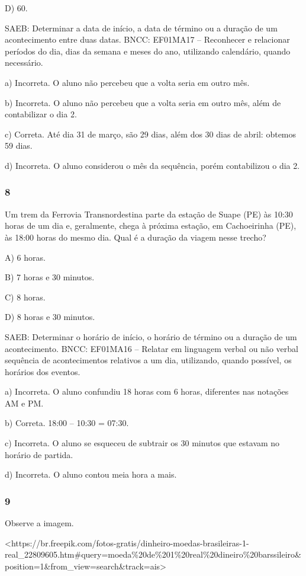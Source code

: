 D) 60.

SAEB: Determinar a data de início, a data de término ou a
duração de um acontecimento entre duas datas.
BNCC: EF01MA17 -- Reconhecer e relacionar períodos do dia, dias da semana
e meses do ano, utilizando calendário, quando necessário.

a) Incorreta. O aluno não percebeu que a volta seria em outro mês.

b) Incorreta. O aluno não percebeu que a volta seria em outro mês, além
de contabilizar o dia 2.

c) Correta. Até dia 31 de março, são 29 dias, além dos 30 dias de abril: obtemos
59 dias.

d) Incorreta. O aluno considerou o mês da sequência, porém contabilizou
o dia 2.

\subsubsection{8}\label{section-109}

Um trem da Ferrovia Transnordestina parte da estação de Suape (PE) às 10:30 horas de um dia e, geralmente, chega à próxima estação, em Cachoeirinha (PE), às 18:00 horas do mesmo dia. Qual é a duração da viagem nesse trecho?

A) 6 horas.

B) 7 horas e 30 minutos.

C) 8 horas.

D) 8 horas e 30 minutos.

SAEB: Determinar o horário de início, o horário de término ou a
duração de um acontecimento.
BNCC: EF01MA16 -- Relatar em linguagem verbal ou não verbal sequência de
acontecimentos relativos a um dia, utilizando, quando possível, os
horários dos eventos.

a) Incorreta. O aluno confundiu 18 horas com 6 horas, diferentes nas notações AM e PM.

b) Correta. 18:00 -- 10:30 = 07:30.

c) Incorreta. O aluno se esqueceu de subtrair os 30 minutos que estavam no horário de partida.

d) Incorreta. O aluno contou meia hora a mais.

\subsubsection{9}\label{section-110}

Observe a imagem.

\textless{}https://br.freepik.com/fotos-gratis/dinheiro-moedas-brasileiras-1-real\_22809605.htm\#query=moeda\%20de\%201\%20real\%20dineiro\%20barssileiro\&position=1\&from\_view=search\&track=ais\textgreater{}

